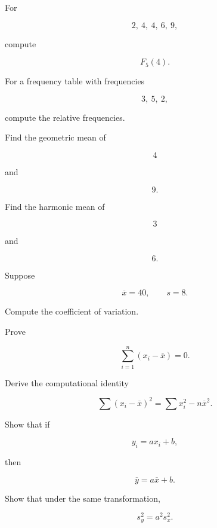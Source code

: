 \begin{exercise}[2]
For

\[
2,\ 4,\ 4,\ 6,\ 9,
\]

compute

\[
F_5(4).
\]
\end{exercise}

\begin{exercise}[2]
For a frequency table with frequencies

\[
3,\ 5,\ 2,
\]

compute the relative frequencies.
\end{exercise}

\begin{exercise}[2]
Find the geometric mean of

\[
4
\]

and

\[
9.
\]
\end{exercise}

\begin{exercise}[2]
Find the harmonic mean of

\[
3
\]

and

\[
6.
\]
\end{exercise}

\begin{exercise}[2]
Suppose

\[
\overline{x}=40,
\qquad
s=8.
\]

Compute the coefficient of variation.
\end{exercise}

\begin{exercise}[3]
Prove

\[
\sum_{i=1}^{n}
(x_i-\overline{x})
=
0.
\]
\end{exercise}

\begin{exercise}[3]
Derive the computational identity

\[
\sum
(x_i-\overline{x})^2
=
\sum x_i^2
-
n\overline{x}^2.
\]
\end{exercise}

\begin{exercise}[3]
Show that if

\[
y_i=ax_i+b,
\]

then

\[
\overline{y}
=
a\overline{x}+b.
\]
\end{exercise}

\begin{exercise}[3]
Show that under the same transformation,

\[
s_y^2
=
a^2s_x^2.
\]
\end{exercise}

